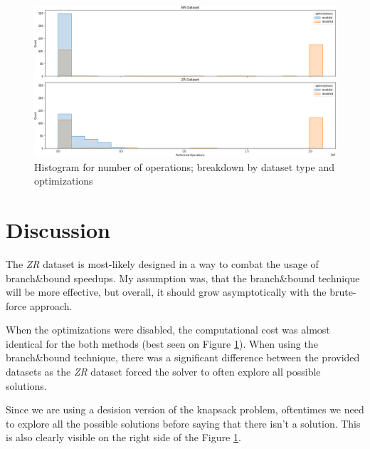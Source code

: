 \documentclass[a4paper,10pt]{article}
\begin{document}
\begin{figure}[!htb]
	\centering
  	\includegraphics[width=\textwidth]{size_20_hist.png}
	\caption{Histogram for number of operations; breakdown by dataset type and optimizations}
	\label{size_20_hist}
\end{figure}


\section{Discussion}
The \emph{ZR} dataset is most-likely designed in a way to combat the usage of branch\&bound speedups. My assumption was, that the branch\&bound technique will be more effective, but overall, it should grow asymptotically with the brute-force approach. 

When the optimizations were disabled, the computational cost was almost identical for the both methods (best seen on Figure \ref{size_20_hist}). When using the branch\&bound technique, there was a significant difference between the provided datasets as the \emph{ZR} dataset forced the solver to often explore all possible solutions.

Since we are using a desision version of the knapsack problem, oftentimes we need to explore all the possible solutions before saying that there isn't a solution. This is also clearly visible on the right side of the Figure \ref{size_20_hist}.
\end{document}

